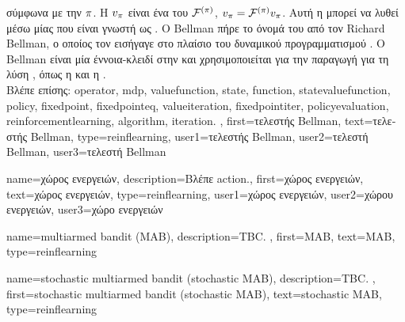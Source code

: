 {{{		σύμφωνα με την $\pi$. Η}  $v_{\pi}$ 
		\foreignlanguage{greek}{είναι ένα}  \foreignlanguage{greek}{του} $\mathcal{F}^{(\pi)}$, 
		$v_{\pi}= \mathcal{F}^{(\pi)}v_{\pi}$. 
		\foreignlanguage{greek}{Αυτή η}  \foreignlanguage{greek}{μπορεί να λυθεί μέσω μίας} 
		 \foreignlanguage{greek}{που είναι γνωστή ως} . 
		\foreignlanguage{greek}{Ο}  Bellman \foreignlanguage{greek}{πήρε το όνομά του από τον} 
		Richard Bellman, \foreignlanguage{greek}{ο οποίος τον εισήγαγε στο πλαίσιο του δυναμικού προγραμματισμού} 
		\cite{Bellman1957}. \foreignlanguage{greek}{Ο}  Bellman \foreignlanguage{greek}{είναι μία
		έννοια-κλειδί στην}  \foreignlanguage{greek}{και χρησιμοποι\-εί\-ται 
		για την παραγωγή}  \foreignlanguage{greek}{για τη λύση} , 
		\foreignlanguage{greek}{όπως η}  \foreignlanguage{greek}{και η}  
		 \cite{SuttonEd2}.
		\\
		\foreignlanguage{greek}{Βλέπε επίσης:} \gls{operator}, \gls{mdp}, \gls{valuefunction}, \gls{state}, \gls{function}, 
		\gls{statevaluefunction}, \gls{policy}, \gls{fixedpoint}, \gls{fixedpointeq}, \gls{valueiteration}, \gls{fixedpointiter}, 
		\gls{policyevaluation}, \gls{reinforcementlearning}, \gls{algorithm}, \gls{iteration}. }, 
	first={\foreignlanguage{greek}{τελεστής} Bellman},
	text={\foreignlanguage{greek}{τελεστής} Bellman},
	type=reinflearning,
	user1={\foreignlanguage{greek}{τελεστής} Bellman}, %
  	user2={\foreignlanguage{greek}{τελεστή} Bellman}, %
	user3={\foreignlanguage{greek}{τελεστή} Bellman} %
}

{name={\foreignlanguage{greek}{χώρος ενεργειών}},
	description={\foreignlanguage{greek}{Βλέπε} \gls{action}.},
	first={\foreignlanguage{greek}{χώρος ενεργειών}},
	text={\foreignlanguage{greek}{χώρος ενεργειών}},
	type=reinflearning,
	user1={\foreignlanguage{greek}{χώρος ενεργειών}}, %
  	user2={\foreignlanguage{greek}{χώρου ενεργειών}}, %
	user3={\foreignlanguage{greek}{χώρο ενεργειών}} %
}

{name={multiarmed bandit (MAB)},
	description={TBC. },
	first={MAB},
	text={MAB},
	type=reinflearning
}

{name={stochastic multiarmed bandit (stochastic MAB)},
	description={TBC. },
	first={stochastic multiarmed bandit (stochastic MAB)},
	text={stochastic MAB},
	type=reinflearning
}